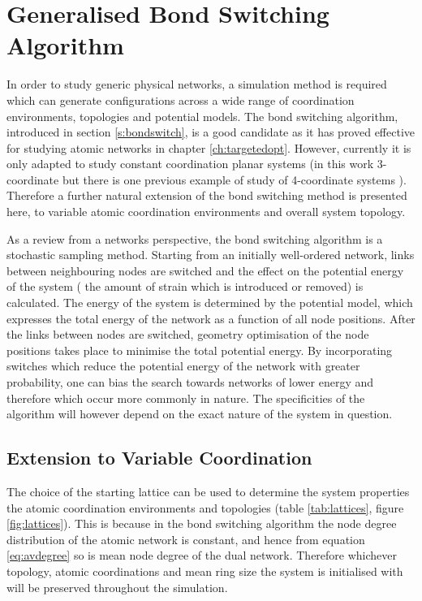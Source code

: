 \section{Generalised Bond Switching Algorithm}

In order to study generic physical networks, a simulation method is required which can generate configurations across a wide range of coordination environments, topologies and potential models. 
The bond switching algorithm, introduced in section \ref{s:bondswitch}, is a good candidate as it has proved effective for studying atomic networks in chapter \ref{ch:targetedopt}.
However, currently it is only adapted to study constant coordination planar systems (in this work 3\--coordinate but there is one previous example of study of 4\--coordinate systems \cite{Greneche1990}).
Therefore a further natural extension of the bond switching method is presented here, to variable atomic coordination environments and overall system topology.

As a review from a networks perspective, the bond switching algorithm is a stochastic sampling method.
Starting from an initially well\--ordered network, links between neighbouring nodes are switched and the effect on the potential energy of the system (\ie{} the amount of strain which is introduced or removed) is calculated.
The energy of the system is determined by the potential model, which expresses the total energy of the network as a function of all node positions.
After the links between nodes are switched, geometry optimisation of the node positions takes place to minimise the total potential energy.
By incorporating switches which reduce the potential energy of the network with greater probability, one can bias the search towards networks of lower energy and therefore which occur more commonly in nature.
The specificities of the algorithm will however depend on the exact nature of the system in question.

\subsection{Extension to Variable Coordination}

The choice of the starting lattice can be used to determine the system properties \ie{} the atomic coordination environments and topologies (table \ref{tab:lattices}, figure \ref{fig:lattices}).
This is because in the bond switching algorithm the node degree distribution of the atomic network is constant, and hence from equation \eqref{eq:avdegree} so is mean node degree of the dual network.
Therefore whichever topology, atomic coordinations and mean ring size the system is initialised with will be preserved throughout the simulation.

